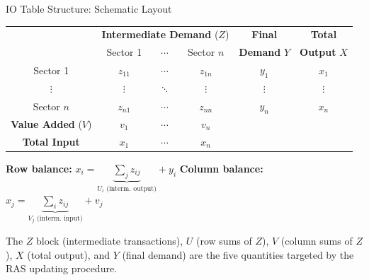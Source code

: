 \documentclass[aspectratio=169]{beamer}
\begin{document}
\begin{frame}{IO Table Structure: Schematic Layout}
\begin{center}
\renewcommand{\arraystretch}{1.25}
\begin{tabular}{c|ccc|c|c}
  & \multicolumn{3}{c|}{\textbf{Intermediate Demand} ($Z$)} & \textbf{Final} & \textbf{Total} \\
  & Sector 1 & $\cdots$ & Sector $n$ & \textbf{Demand} $Y$ & \textbf{Output} $X$ \\
\hline
Sector 1       & $z_{11}$ & $\cdots$ & $z_{1n}$ & $y_1$ & $x_1$ \\
$\vdots$       & $\vdots$ & $\ddots$ & $\vdots$ & $\vdots$ & $\vdots$ \\
Sector $n$     & $z_{n1}$ & $\cdots$ & $z_{nn}$ & $y_n$ & $x_n$ \\
\hline
\textbf{Value Added} ($V$) & $v_1$ & $\cdots$ & $v_n$ & & \\
\textbf{Total Input}       & $x_1$ & $\cdots$ & $x_n$ & & \\
\end{tabular}
\end{center}

\medskip
\small
\textbf{Row balance:} $x_i = \underbrace{\sum_j z_{ij}}_{U_i \text{ (interm.\ output)}} + y_i$
\quad
\textbf{Column balance:} $x_j = \underbrace{\sum_i z_{ij}}_{V_j \text{ (interm.\ input)}} + v_j$

\medskip
The $Z$ block (intermediate transactions), $U$ (row sums of $Z$), $V$ (column sums of $Z$), $X$ (total output), and $Y$ (final demand) are the five quantities targeted by the RAS updating procedure.
\end{frame}
\end{document}
